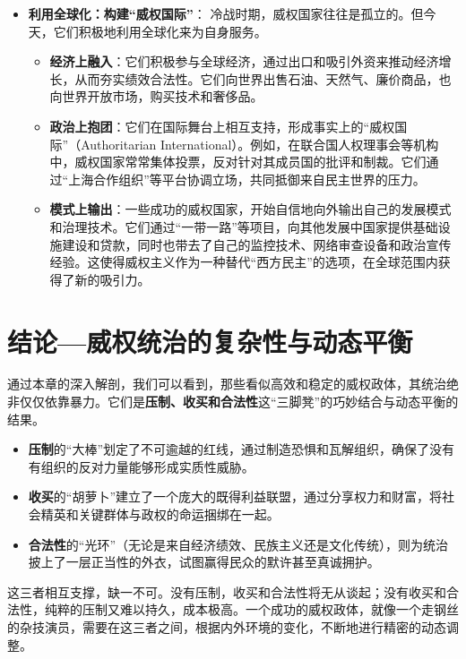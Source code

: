 \begin{itemize}
\begin{itemize}
    \end{itemize}
    \item \textbf{利用全球化：构建“威权国际”}：
    冷战时期，威权国家往往是孤立的。但今天，它们积极地利用全球化来为自身服务。
    \begin{itemize}
        \item \textbf{经济上融入}：它们积极参与全球经济，通过出口和吸引外资来推动经济增长，从而夯实绩效合法性。它们向世界出售石油、天然气、廉价商品，也向世界开放市场，购买技术和奢侈品。
        \item \textbf{政治上抱团}：它们在国际舞台上相互支持，形成事实上的“威权国际”（Authoritarian International）。例如，在联合国人权理事会等机构中，威权国家常常集体投票，反对针对其成员国的批评和制裁。它们通过“上海合作组织”等平台协调立场，共同抵御来自民主世界的压力。
        \item \textbf{模式上输出}：一些成功的威权国家，开始自信地向外输出自己的发展模式和治理技术。它们通过“一带一路”等项目，向其他发展中国家提供基础设施建设和贷款，同时也带去了自己的监控技术、网络审查设备和政治宣传经验。这使得威权主义作为一种替代“西方民主”的选项，在全球范围内获得了新的吸引力。
    \end{itemize}
\end{itemize}

\section*{结论---威权统治的复杂性与动态平衡}

通过本章的深入解剖，我们可以看到，那些看似高效和稳定的威权政体，其统治绝非仅仅依靠暴力。它们是\textbf{压制、收买和合法性}这“三脚凳”的巧妙结合与动态平衡的结果。

\begin{itemize}
    \item \textbf{压制}的“大棒”划定了不可逾越的红线，通过制造恐惧和瓦解组织，确保了没有有组织的反对力量能够形成实质性威胁。
    \item \textbf{收买}的“胡萝卜”建立了一个庞大的既得利益联盟，通过分享权力和财富，将社会精英和关键群体与政权的命运捆绑在一起。
    \item \textbf{合法性}的“光环”（无论是来自经济绩效、民族主义还是文化传统），则为统治披上了一层正当性的外衣，试图赢得民众的默许甚至真诚拥护。
\end{itemize}

这三者相互支撑，缺一不可。没有压制，收买和合法性将无从谈起；没有收买和合法性，纯粹的压制又难以持久，成本极高。一个成功的威权政体，就像一个走钢丝的杂技演员，需要在这三者之间，根据内外环境的变化，不断地进行精密的动态调整。

